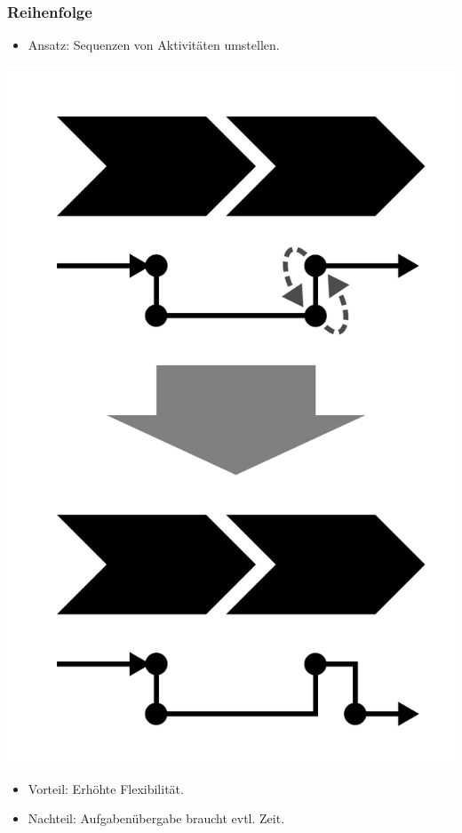 \documentclass[xcolor=dvipsnames]{beamer}
\begin{document}
 \begin{frame}
  \frametitle{Reihenfolge}
    \begin{itemize}
    \item Ansatz: Sequenzen von Aktivitäten umstellen.
  \end{itemize}
  \centerline{\includegraphics[scale=2.5]{4_6_6.png}}
  \begin{itemize}
    \item Vorteil: Erhöhte Flexibilität.
    \item Nachteil: Aufgabenübergabe braucht evtl. Zeit.
  \end{itemize}
 \end{frame}
\end{document}
